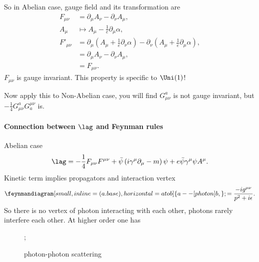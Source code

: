 So in Abelian case, gauge field and its transformation are
\begin{align*}
   F_{\mu\nu} &= \partial_\mu A_\nu - \partial_\nu A_\mu, \\
   A_\mu & \mapsto A_\mu - \frac{1}{e} \partial_\mu \alpha,  \\
   F'_{\mu\nu} &= \partial_\mu \left( A_\mu + \frac{1}{e} \partial_\nu \alpha \right) - \partial_\nu \left( A_\mu + \frac{1}{e} \partial_\mu \alpha \right), \\
               &= \partial_\mu A_\nu - \partial_\nu A_\mu, \\
               &= F_{\mu\nu}.
\end{align*}
$F_{\mu\nu}$ is gauge invariant. This property is specific to $ \Uni (1)$!

Now apply this to Non-Abelian case, you will find $G_{\mu\nu}^a$ is not gauge invariant, but $-\frac{1}{4}G_{\mu\nu}^a G^{\mu\nu}_a$ is.

\paragraph{Connection between $\lag$ and Feynman rules}
Abelian case
\begin{align*}
   \lag = -\frac{1}{4}F_{\mu\nu}F^{\mu\nu} + \bar\psi \left( i \gamma^\mu \partial_\mu - m \right) \psi + e \bar\psi \gamma^\mu \psi A^\mu.
\end{align*}
Kinetic term implies propagators and interaction vertex
\begin{align}
   \feynmandiagram[small, inline=(a.base), horizontal=a to b]{ a --[photon] b,};
   = \frac{-ig^{\mu\nu}}{p^2 + i \epsilon}.
\end{align}
So there is no vertex of photon interacting with each other, photons rarely interfere each other. At higher order one has
\begin{figure}[htpb]
   \centering
   ;
   \caption{photon-photon scattering}%
   \label{fig:pps}
\end{figure}

